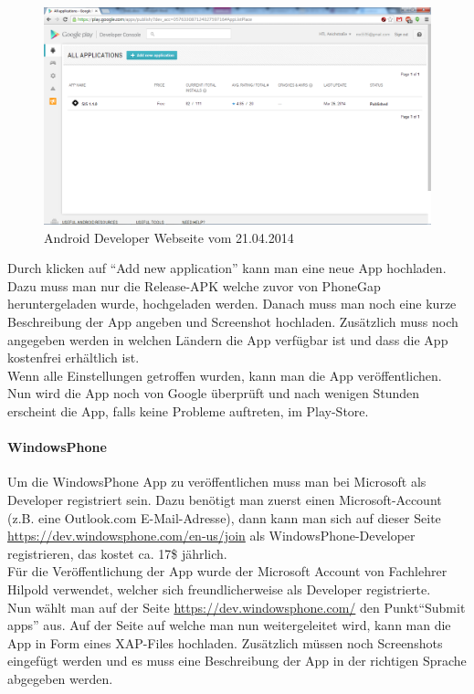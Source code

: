 \begin{figure}[H]
\includegraphics[keepaspectratio=true, width=14cm]{images/appstores/AndroidDeveloper2.png}
\caption{Android Developer Webseite vom 21.04.2014}
\end{figure}

Durch klicken auf \enquote{Add new application} kann man eine neue App hochladen. Dazu muss man nur die Release-APK welche zuvor von PhoneGap heruntergeladen wurde, hochgeladen werden. Danach muss man noch eine kurze Beschreibung der App angeben und Screenshot hochladen. Zusätzlich muss noch angegeben werden in welchen Ländern die App verfügbar ist und dass die App kostenfrei erhältlich ist.\\
Wenn alle Einstellungen getroffen wurden, kann man die App veröffentlichen. Nun wird die App noch von Google überprüft und nach wenigen Stunden erscheint die App, falls keine Probleme auftreten, im Play-Store.\\

\paragraph{WindowsPhone\\}

Um die WindowsPhone App zu veröffentlichen muss man bei Microsoft als Developer registriert sein. Dazu benötigt man zuerst einen Microsoft-Account (z.B. eine Outlook.com E-Mail-Adresse), dann kann man sich auf dieser Seite \href{https://dev.windowsphone.com/en-us/join}{https://dev.windowsphone.com/en-us/join}  als WindowsPhone-Developer registrieren, das kostet ca. 17\$ jährlich.\\
Für die Veröffentlichung der App wurde der Microsoft Account von Fachlehrer Hilpold verwendet, welcher sich freundlicherweise als Developer registrierte.\\
Nun wählt man auf der Seite \href{https://dev.windowsphone.com/}{https://dev.windowsphone.com/} den Punkt\enquote{Submit apps} aus. Auf der Seite auf welche man nun weitergeleitet wird, kann man die App in Form eines XAP-Files hochladen. Zusätzlich müssen noch Screenshots eingefügt werden und es muss eine Beschreibung der App in der richtigen Sprache abgegeben werden.\\

